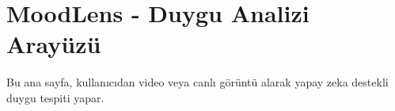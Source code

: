 \chapter{Mood\+Lens -\/ Duygu Analizi Arayüzü }
\hypertarget{index}{}\label{index}
Bu ana sayfa, kullanıcıdan video veya canlı görüntü alarak yapay zeka destekli duygu tespiti yapar. 